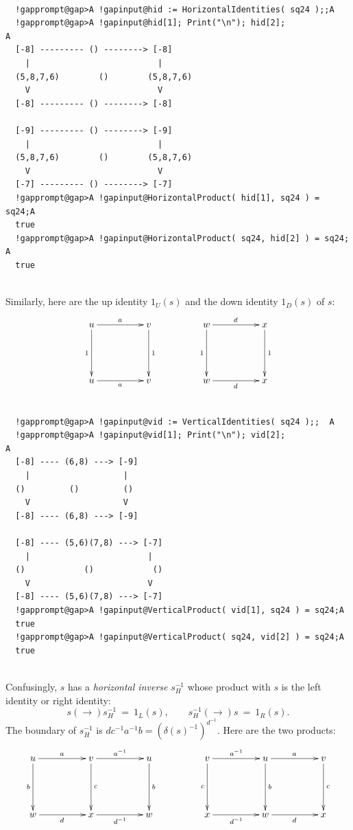 \documentclass[a4paper,11pt]{report}
\begin{document}
{{{ }

 
\begin{Verbatim}[commandchars=!@A,fontsize=\small,frame=single,label=Example]
  
  !gapprompt@gap>A !gapinput@hid := HorizontalIdentities( sq24 );;A
  !gapprompt@gap>A !gapinput@hid[1]; Print("\n"); hid[2];                    A
  [-8] --------- () --------> [-8]
    |                          |
  (5,8,7,6)        ()        (5,8,7,6)
    V                          V
  [-8] --------- () --------> [-8]
  
  [-9] --------- () --------> [-9]
    |                          |
  (5,8,7,6)        ()        (5,8,7,6)
    V                          V
  [-7] --------- () --------> [-7]
  !gapprompt@gap>A !gapinput@HorizontalProduct( hid[1], sq24 ) = sq24;A
  true
  !gapprompt@gap>A !gapinput@HorizontalProduct( sq24, hid[2] ) = sq24;      A
  true
  
\end{Verbatim}
 Similarly, here are the up identity $1_U(s)$ and the down identity $1_D(s)$ of $s$: 
\[  \vcenter{\xymatrix @=4pc{ u \ar[r]^{a} \ar[d]_{1} & v \ar[d]^{1} & w
\ar[r]^{d} \ar[d]_{1} & x \ar[d]^{1} \\ u \ar[r]_{a} & v & w \ar[r]_{d} & x }} \]
 
\begin{Verbatim}[commandchars=!@A,fontsize=\small,frame=single,label=Example]
  
  !gapprompt@gap>A !gapinput@vid := VerticalIdentities( sq24 );;  A
  !gapprompt@gap>A !gapinput@vid[1]; Print("\n"); vid[2];                    A
  [-8] ---- (6,8) ---> [-9]
    |                   |
  ()         ()         ()
    V                   V
  [-8] ---- (6,8) ---> [-9]
  
  [-8] ---- (5,6)(7,8) ---> [-7]
    |                        |
  ()            ()            ()
    V                        V
  [-8] ---- (5,6)(7,8) ---> [-7]
  !gapprompt@gap>A !gapinput@VerticalProduct( vid[1], sq24 ) = sq24;A
  true
  !gapprompt@gap>A !gapinput@VerticalProduct( sq24, vid[2] ) = sq24;A
  true
  
\end{Verbatim}
 Confusingly, $s$ has a \emph{horizontal inverse} $s^{-1}_{H}$ whose product with $s$ is the left identity or right identity: 
\[ s (\rightarrow) s^{-1}_{H} ~=~ 1_L(s), \qquad s^{-1}_{H} (\rightarrow) s ~=~
1_R(s). \]
 The boundary of $s^{-1}_{H}$ is $dc^{-1}a^{-1}b = (\delta(s)^{-1})^{d^{-1}}$. Here are the two products: 
\[  \vcenter{\xymatrix @=4pc{ u \ar[r]^{a} \ar[d]_{b} & v \ar[r]^{a^{-1}}
\ar[d]^{c} & u \ar[d]^{b} & v \ar[r]^{a^{-1}} \ar[d]_{c} & u \ar[r]^{a}
\ar[d]^{b} & v \ar[d]^{c} \\ w \ar[r]_{d} & x \ar[r]_{d^{-1}} & w & x
\ar[r]_{d^{-1}} & w \ar[r]_{d} & x }} \]
 
}}
\end{document}
